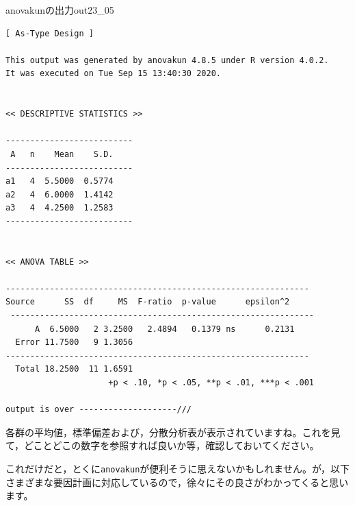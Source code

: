 \documentclass{ltjbook}
\begin{document}
\begin{Rscreen}{anovakunの出力}{out23_05}

	\begin{verbatim}
[ As-Type Design ]

This output was generated by anovakun 4.8.5 under R version 4.0.2.
It was executed on Tue Sep 15 13:40:30 2020.
    
     
<< DESCRIPTIVE STATISTICS >>
    
--------------------------
 A   n    Mean    S.D. 
--------------------------
a1   4  5.5000  0.5774 
a2   4  6.0000  1.4142 
a3   4  4.2500  1.2583 
--------------------------
    
    
<< ANOVA TABLE >>
    
--------------------------------------------------------------
Source      SS  df     MS  F-ratio  p-value      epsilon^2 
 --------------------------------------------------------------
      A  6.5000   2 3.2500   2.4894   0.1379 ns      0.2131 
  Error 11.7500   9 1.3056                                  
--------------------------------------------------------------
  Total 18.2500  11 1.6591                                  
                     +p < .10, *p < .05, **p < .01, ***p < .001

output is over --------------------///
\end{verbatim}
\end{Rscreen}
各群の平均値，標準偏差および，分散分析表が表示されていますね。これを見て，どことどこの数字を参照すれば良いか等，確認しておいてください。

これだけだと，とくに\texttt{anovakun}が便利そうに思えないかもしれません。が，以下さまざまな要因計画に対応しているので，徐々にその良さがわかってくると思います。
\end{document}
